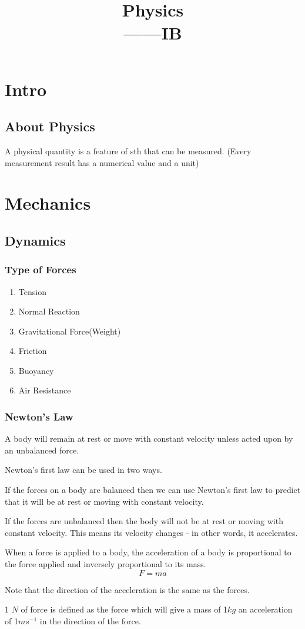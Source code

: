 \documentclass[11pt, a4paper,oneside]{book}
\title{{\Huge{\textbf{Physics}}}\\——IB}
\author{}
\date{}
\begin{document}

\pagestyle{empty}
\chapter{Intro}
\section{About Physics}
\begin{definition}
    A physical quantity is a feature of sth that can be measured. (Every measurement result has a numerical value and a unit)
\end{definition}
\chapter{Mechanics}
\section{Dynamics}
\subsection{Type of Forces}
\begin{enumerate}
    \setlength{\itemsep}{-1ex}
    \setlength{\parsep}{-1ex}
    \setlength{\topsep}{-1em}
    \item Tension
    \item Normal Reaction
    \item Gravitational Force(Weight)
    \item Friction
    \item Buoyancy
    \item Air Resistance
\end{enumerate}
\subsection{Newton's Law}
\begin{theorem}
    A body will remain at rest or move with constant velocity unless acted upon by an unbalanced force.
\end{theorem}

Newton's first law can be used in two ways. \par 
If the forces on a body are balanced then we can use Newton's first law to predict that it will be at rest
or moving with constant velocity. \par If the forces are unbalanced then the body will not be at rest or moving with constant velocity. This means its velocity changes - in other words, it accelerates.
\begin{theorem}
When a force is applied to a body, the acceleration of a body is proportional to the force applied and inversely proportional to its mass. $$F = ma$$
\end{theorem}\par
Note that the direction of the acceleration is the same as the forces.
\begin{definition}[Newton]
    1 $ N $ of force is defined as the force which will give a mass of 1$kg$ an acceleration of 1$ms^{-1}$ in the direction of the force.
\end{definition}
\end{document}
